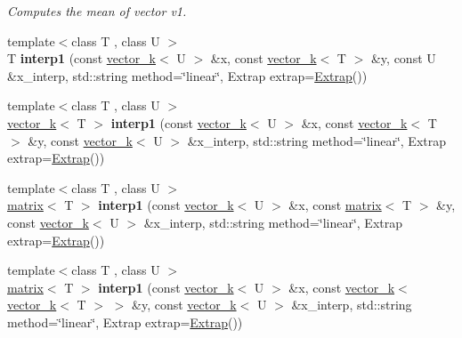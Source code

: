 \begin{DoxyCompactItemize}
\begin{DoxyCompactList}\small\item\em Computes the mean of vector v1. \end{DoxyCompactList}\item 
\hypertarget{namespacekeycpp_a17458d17162284844399c9cc52be09ff}{{\footnotesize template$<$class T , class U $>$ }\\T {\bfseries interp1} (const \hyperlink{classkeycpp_1_1vector__k}{vector\-\_\-k}$<$ U $>$ \&x, const \hyperlink{classkeycpp_1_1vector__k}{vector\-\_\-k}$<$ T $>$ \&y, const U \&x\-\_\-interp, std\-::string method=\char`\"{}linear\char`\"{}, Extrap extrap=\hyperlink{classkeycpp_1_1_extrap}{Extrap}())}\label{namespacekeycpp_a17458d17162284844399c9cc52be09ff}

\item 
\hypertarget{namespacekeycpp_af195484fa3f7653204623e2adc85d595}{{\footnotesize template$<$class T , class U $>$ }\\\hyperlink{classkeycpp_1_1vector__k}{vector\-\_\-k}$<$ T $>$ {\bfseries interp1} (const \hyperlink{classkeycpp_1_1vector__k}{vector\-\_\-k}$<$ U $>$ \&x, const \hyperlink{classkeycpp_1_1vector__k}{vector\-\_\-k}$<$ T $>$ \&y, const \hyperlink{classkeycpp_1_1vector__k}{vector\-\_\-k}$<$ U $>$ \&x\-\_\-interp, std\-::string method=\char`\"{}linear\char`\"{}, Extrap extrap=\hyperlink{classkeycpp_1_1_extrap}{Extrap}())}\label{namespacekeycpp_af195484fa3f7653204623e2adc85d595}

\item 
\hypertarget{namespacekeycpp_a6b00eb8d7f354173545ef98ad9da47cc}{{\footnotesize template$<$class T , class U $>$ }\\\hyperlink{classkeycpp_1_1matrix}{matrix}$<$ T $>$ {\bfseries interp1} (const \hyperlink{classkeycpp_1_1vector__k}{vector\-\_\-k}$<$ U $>$ \&x, const \hyperlink{classkeycpp_1_1matrix}{matrix}$<$ T $>$ \&y, const \hyperlink{classkeycpp_1_1vector__k}{vector\-\_\-k}$<$ U $>$ \&x\-\_\-interp, std\-::string method=\char`\"{}linear\char`\"{}, Extrap extrap=\hyperlink{classkeycpp_1_1_extrap}{Extrap}())}\label{namespacekeycpp_a6b00eb8d7f354173545ef98ad9da47cc}

\item 
\hypertarget{namespacekeycpp_a4c080370a07cc78709cc7992b208567e}{{\footnotesize template$<$class T , class U $>$ }\\\hyperlink{classkeycpp_1_1matrix}{matrix}$<$ T $>$ {\bfseries interp1} (const \hyperlink{classkeycpp_1_1vector__k}{vector\-\_\-k}$<$ U $>$ \&x, const \hyperlink{classkeycpp_1_1vector__k}{vector\-\_\-k}$<$ \hyperlink{classkeycpp_1_1vector__k}{vector\-\_\-k}$<$ T $>$ $>$ \&y, const \hyperlink{classkeycpp_1_1vector__k}{vector\-\_\-k}$<$ U $>$ \&x\-\_\-interp, std\-::string method=\char`\"{}linear\char`\"{}, Extrap extrap=\hyperlink{classkeycpp_1_1_extrap}{Extrap}())}\label{namespacekeycpp_a4c080370a07cc78709cc7992b208567e}


\end{DoxyCompactItemize}
